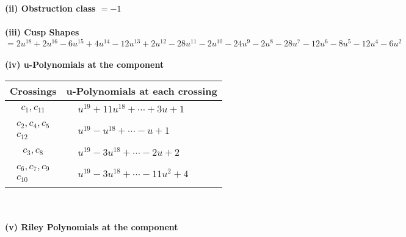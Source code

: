 \documentclass[1p]{elsarticle_modified}
\theoremstyle{definition}
\begin{document}
\flushleft \textbf{(ii) Obstruction class $= -1$}\\~\\
\flushleft \textbf{(iii) Cusp Shapes $= 2 u^{18}+2 u^{16}-6 u^{15}+4 u^{14}-12 u^{13}+2 u^{12}-28 u^{11}-2 u^{10}-24 u^9-2 u^8-28 u^7-12 u^6-8 u^5-12 u^4-6 u^2$}\\~\\
\newpage\renewcommand{\arraystretch}{1}
\flushleft \textbf{(iv) u-Polynomials at the component}\newline \\
\begin{tabular}{m{50pt}|m{274pt}}
Crossings & \hspace{64pt}u-Polynomials at each crossing \\
\hline $$\begin{aligned}c_{1},c_{11}\end{aligned}$$&$\begin{aligned}
&u^{19}+11 u^{18}+\cdots+3 u+1
\end{aligned}$\\
\hline $$\begin{aligned}c_{2},c_{4},c_{5}\\c_{12}\end{aligned}$$&$\begin{aligned}
&u^{19}- u^{18}+\cdots- u+1
\end{aligned}$\\
\hline $$\begin{aligned}c_{3},c_{8}\end{aligned}$$&$\begin{aligned}
&u^{19}-3 u^{18}+\cdots-2 u+2
\end{aligned}$\\
\hline $$\begin{aligned}c_{6},c_{7},c_{9}\\c_{10}\end{aligned}$$&$\begin{aligned}
&u^{19}-3 u^{18}+\cdots-11 u^2+4
\end{aligned}$\\
\hline
\end{tabular}\\~\\
\newpage\renewcommand{\arraystretch}{1}
\flushleft \textbf{(v) Riley Polynomials at the component}\newline \\
\end{document}
